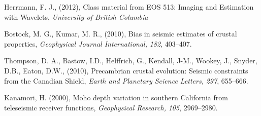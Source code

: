 \documentclass[jgrga]{agutex}
\begin{document}
\begin{article}
\begin{thebibliography}{}
Herrmann, F. J., (2012), Class material from EOS 513: Imaging and Estimation with Wavelets, {\it University of British Columbia}

Bostock, M. G., Kumar, M. R., (2010), Bias in seismic estimates of crustal properties, {\it Geophysical Journal International,} \textit{182}, 403--407.

Thompson, D. A., Bastow, I.D., Helffrich, G., Kendall, J-M., Wookey, J., Snyder, D.B., Eaton, D.W., (2010), Precambrian crustal evolution: Seismic constraints from the Canadian Shield, {\it Earth and Planetary Science Letters,} \textit{297}, 655--666.

Kanamori, H. (2000), Moho depth variation in southern California from teleseismic receiver functions, {\it Geophysical Research,} \textit{105}, 2969--2980.


\end{thebibliography}




%

%
%

\end{article}


%
%
\end{document}

